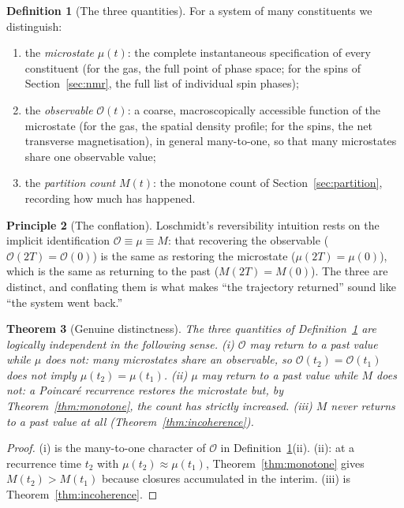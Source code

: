 \documentclass[11pt,a4paper]{article}
\theoremstyle{thmstyle}
\newtheorem{theorem}{Theorem}[section]
\theoremstyle{definition}
\newtheorem{definition}[theorem]{Definition}
\newtheorem{principle}[theorem]{Principle}
\theoremstyle{remark}
\newcommand{\Obs}{\mathcal{O}}
\newcommand{\Mic}{\mu}
\newcommand{\Count}{M}
\begin{document}
\begin{definition}[The three quantities]
\label{def:three}
For a system of many constituents we distinguish:
\begin{enumerate}[leftmargin=1.6em,label=(\roman*),itemsep=0.2em]
\item the \emph{microstate} $\Mic(t)$: the complete instantaneous
specification of every constituent (for the gas, the full point of phase
space; for the spins of Section~\ref{sec:nmr}, the full list of
individual spin phases);
\item the \emph{observable} $\Obs(t)$: a coarse, macroscopically
accessible function of the microstate (for the gas, the spatial density
profile; for the spins, the net transverse magnetisation), in general
many-to-one, so that many microstates share one observable value;
\item the \emph{partition count} $\Count(t)$: the monotone count of
Section~\ref{sec:partition}, recording how much has happened.
\end{enumerate}
\end{definition}

\begin{principle}[The conflation]
\label{prin:conflation}
Loschmidt's reversibility intuition rests on the implicit identification
$\Obs\equiv\Mic\equiv\Count$: that recovering the observable
($\Obs(2T)=\Obs(0)$) is the same as restoring the microstate
($\Mic(2T)=\Mic(0)$), which is the same as returning to the past
($\Count(2T)=\Count(0)$). The three are distinct, and conflating them is
what makes ``the trajectory returned'' sound like ``the system went
back.''
\end{principle}

\begin{theorem}[Genuine distinctness]
\label{thm:distinct}
The three quantities of Definition~\ref{def:three} are logically
independent in the following sense. (i) $\Obs$ may return to a past value
while $\Mic$ does not: many microstates share an observable, so
$\Obs(t_{2})=\Obs(t_{1})$ does not imply $\Mic(t_{2})=\Mic(t_{1})$. (ii)
$\Mic$ may return to a past value while $\Count$ does not: a Poincar\'e
recurrence restores the microstate but, by Theorem~\ref{thm:monotone},
the count has strictly increased. (iii) $\Count$ never returns to a past
value at all (Theorem~\ref{thm:incoherence}).
\end{theorem}

\begin{proof}
(i) is the many-to-one character of $\Obs$ in
Definition~\ref{def:three}(ii). (ii): at a recurrence time $t_{2}$ with
$\Mic(t_{2})\approx\Mic(t_{1})$, Theorem~\ref{thm:monotone} gives
$\Count(t_{2})>\Count(t_{1})$ because closures accumulated in the
interim. (iii) is Theorem~\ref{thm:incoherence}.
\end{proof}
\end{document}
